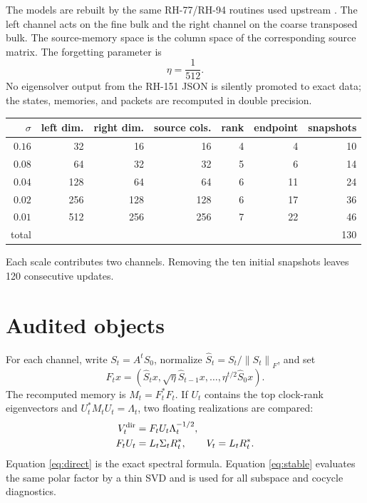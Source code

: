 \documentclass[12pt]{article}
\theoremstyle{remark}
\newcommand{\norm}[1]{\left\lVert#1\right\rVert}
\begin{document}
The models are rebuilt by the same RH-77/RH-94 routines used upstream
\citep{WangRH77,WangRH94}.  The left channel acts on the fine bulk and the
right channel on the coarse transposed bulk.  The source-memory space is the
column space of the corresponding source matrix.  The forgetting parameter
is
\[
 \eta=\frac1{512}.
\]
No eigensolver output from the RH-151 JSON is silently promoted to exact
data; the states, memories, and packets are recomputed in double precision.

\begin{center}
\begin{tabular}{rrrrrrr}
\toprule
$\sigma$ & left dim. & right dim. & source cols. & rank & endpoint & snapshots\\
\midrule
$0.16$ & 32 & 16 & 16 & 4 & 4 & 10\\
$0.08$ & 64 & 32 & 32 & 5 & 6 & 14\\
$0.04$ & 128 & 64 & 64 & 6 & 11 & 24\\
$0.02$ & 256 & 128 & 128 & 6 & 17 & 36\\
$0.01$ & 512 & 256 & 256 & 7 & 22 & 46\\
\midrule
total & & & & & & 130\\
\bottomrule
\end{tabular}
\end{center}
Each scale contributes two channels.  Removing the ten initial snapshots
leaves 120 consecutive updates.

\section{Audited objects}

For each channel, write $S_t=A^tS_0$, normalize
$\widehat S_t=S_t/\norm{S_t}_F$, and set
\[
 F_tx=(\widehat S_tx,\sqrt\eta\widehat S_{t-1}x,
 \ldots,\eta^{t/2}\widehat S_0x).
\]
The recomputed memory is $M_t=F_t^*F_t$.  If $U_t$ contains the top
clock-rank eigenvectors and
$U_t^*M_tU_t=\Lambda_t$, two floating realizations are compared:
\begin{align}
 V_t^{\rm dir}&=F_tU_t\Lambda_t^{-1/2},\label{eq:direct}\\
 F_tU_t&=L_t\Sigma_tR_t^*,
 \qquad V_t=L_tR_t^*.\label{eq:stable}
\end{align}
Equation \eqref{eq:direct} is the exact spectral formula.  Equation
\eqref{eq:stable} evaluates the same polar factor by a thin SVD and is used
for all subspace and cocycle diagnostics.
\end{document}
